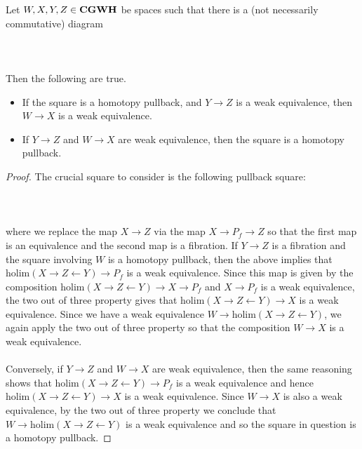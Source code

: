 \documentclass[a4paper]{article}
\begin{document}
\begin{prp}{}{} Let $W,X,Y,Z\in\bold{CGWH}$ be spaces such that there is a (not necessarily commutative) diagram \\~\\
\\~\\
Then the following are true. 
\begin{itemize}
\item If the square is a homotopy pullback, and $Y\to Z$ is a weak equivalence, then $W\to X$ is a weak equivalence. 
\item If $Y\to Z$ and $W\to X$ are weak equivalence, then the square is a homotopy pullback. 
\end{itemize} \tcbline
\begin{proof}
The crucial square to consider is the following pullback square: \\~\\
\\~\\
where we replace the map $X\to Z$ via the map $X\to P_f\to Z$ so that the first map is an equivalence and the second map is a fibration. If $Y\to Z$ is a fibration and the square involving $W$ is a homotopy pullback, then the above implies that $\text{holim}(X\rightarrow Z\leftarrow Y)\to P_f$ is a weak equivalence. Since this map is given by the composition $\text{holim}(X\rightarrow Z\leftarrow Y)\to X\to P_f$ and $X\to P_f$ is a weak equivalence, the two out of three property gives that $\text{holim}(X\rightarrow Z\leftarrow Y)\to X$ is a weak equivalence. Since we have a weak equivalence $W\to\text{holim}(X\rightarrow Z\leftarrow Y)$, we again apply the two out of three property so that the composition $W\to X$ is a weak equivalence. \\~\\

Conversely, if $Y\to Z$ and $W\to X$ are weak equivalence, then the same reasoning shows that $\text{holim}(X\rightarrow Z\leftarrow Y)\to P_f$ is a weak equivalence and hence $\text{holim}(X\rightarrow Z\leftarrow Y)\to X$ is a weak equivalence. Since $W\to X$ is also a weak equivalence, by the two out of three property we conclude that $W\to\text{holim}(X\rightarrow Z\leftarrow Y)$ is a weak equivalence and so the square in question is a homotopy pullback. 
\end{proof}
\end{prp}
\end{document}
